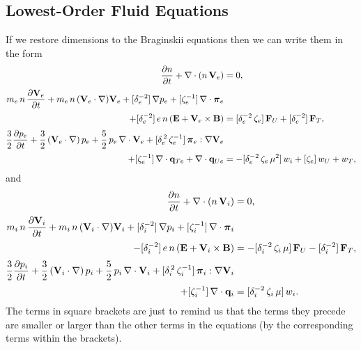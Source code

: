 \documentclass[notitlepage,12pt]{article}
\newcommand{\bpi}{\mbox{\boldmath$\pi$}}
\begin{document}
\subsection{Lowest-Order Fluid Equations}
If we restore dimensions to the Braginskii equations then we can write them in the form
\begin{align}
\frac{\partial n}{\partial t} + \nabla\cdot(n\,{\bf V}_e) &= 0,\label{e3.151a}\\[0.5ex]
m_e\, n\,\frac{\partial  {\bf V}_e}{\partial t} +
m_e\, n\,({\bf V}_e\cdot\nabla){\bf V}_e+
 [\delta_e^{-2}]\,\nabla p_e+
[\zeta_e^{-1}]\, \nabla\cdot \bpi_e &\label{e3.151b}\\[0.5ex]
 +[\delta_e^{-2}]\,e\, n\,
({\bf E} + {\bf V}_e\times {\bf B})& =[\delta_e^{-2}\,\zeta_e]\, {\bf F}_U + [\delta_e^{-2}]\,
{\bf F}_T,\nonumber\\[0.5ex]
\frac{3}{2}\frac{\partial  p_e}{\partial t} + \frac{3}{2}
 \,({\bf V}_e\cdot\nabla)\, p_e 
+ \frac{5}{2}\,p_e\,\nabla\cdot{\bf V}_e+[\delta_e^{\,2}\,\zeta_e^{-1}]\, \bpi_e:\nabla{\bf V}_e&\label{e3.151c}\\[0.5ex]
+ [\zeta_e^{-1}]\,\nabla\cdot{\bf q}_{Te} +\nabla\cdot{\bf q}_{Ue}  &=-[\delta_e^{-2}\,\zeta_e\,\mu^2]\,
 w_i+ [\zeta_e]\,w_U + w_T,\nonumber
\end{align}
and
\begin{align}\label{e3.152a}
\frac{\partial n}{\partial t} +\nabla\cdot(n\,{\bf V}_i) &= 0,\\[0.5ex]
m_i \,n\,\frac{\partial  {\bf V}_i}{\partial t} +
m_i \,n\,({\bf V}_i\cdot\nabla) {\bf V}_i +
 [\delta_i^{-2}]\,\nabla p_i + 
[\zeta_i^{-1}]\,\nabla\cdot \bpi_i &\label{e3.152b}\\[0.5ex]
- [\delta_i^{-2}]\,e \,n\,
({\bf E} + {\bf V}_i\times {\bf B})& =-[\delta_i^{-2}\,\zeta_i\,\mu]\, {\bf F}_U - [\delta_i^{-2}]\,{\bf F}_T,
\nonumber\\[0.5ex]
\frac{3}{2}\frac{\partial  p_i}{\partial t} +   \frac{3}{2}
 \,({\bf V}_i\cdot\nabla) \,p_i
+ \frac{5}{2}\,p_i\,\nabla\cdot{\bf V}_i+[\delta_i^{\,2}\,\zeta_i^{-1}]\, \bpi_i:\nabla{\bf V}_i\nonumber\\[0.5ex]
+ [\zeta_i^{-1}]\,\nabla\cdot{\bf q}_i &= [\delta_i^{-2}\,\zeta_i\,\mu]\,w_i.\label{e3.152c}
\end{align}
The terms in square brackets are just to remind us that the terms they precede are smaller or larger than the
other terms in the equations (by the corresponding terms within the brackets). 
\end{document}
